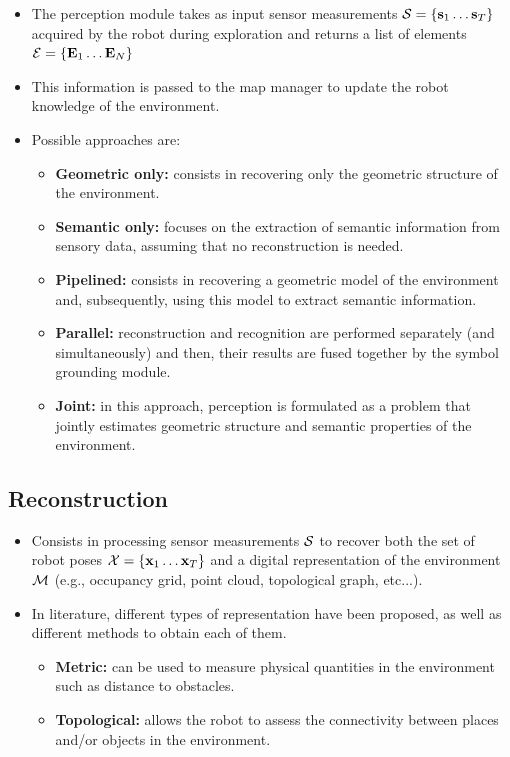 \documentclass{article}
\begin{document}
	\begin{itemize}
		\item The perception module takes as input sensor measurements $\mathcal{S} = \{ \mathbf{s}_1 \dots \mathbf{s}_T \}$ acquired by the robot during exploration and returns a list of elements $\mathcal{E} = \{ \mathbf{E}_1 \dots \mathbf{E}_N \}$
		
		\item This information is passed to the map manager to update the robot knowledge of the environment.
		
		\item 	Possible approaches are:
		\begin{itemize}
			\item {\bf Geometric only:} consists in recovering only the geometric structure of the environment.
			\item {\bf Semantic only:} focuses on the extraction of semantic information from sensory data, assuming that no reconstruction is needed.
			\item {\bf Pipelined:} consists in recovering a geometric model of the environment and, subsequently, using this model to extract semantic information.
			\item {\bf Parallel:} reconstruction and recognition are performed separately (and simultaneously) and then, their results are fused together by the symbol grounding module.
			\item {\bf Joint:} in this approach, perception is formulated as a problem that jointly estimates geometric structure and semantic properties of the environment. 
		\end{itemize}
	\end{itemize}
	
	\subsection{Reconstruction}

	\begin{itemize}
		\item Consists in processing sensor measurements $\mathcal{S}$ to recover both the set of robot poses $\mathcal{X} = \{ \mathbf{x}_1 \dots \mathbf{x}_T \}$ and a digital representation of the environment $\mathcal{M}$ (e.g., occupancy grid, point cloud, topological graph, etc...).
		\item 	In literature,  different types of representation have been proposed, as well as different methods to obtain each of them.
		\begin{itemize}
			\item {\bf Metric:} can be used to measure physical quantities in the environment such as distance to obstacles.
			\item {\bf Topological:} allows the robot to assess the connectivity between places and/or objects in the environment.
		\end{itemize}
	\end{itemize}	
		
\end{document}

